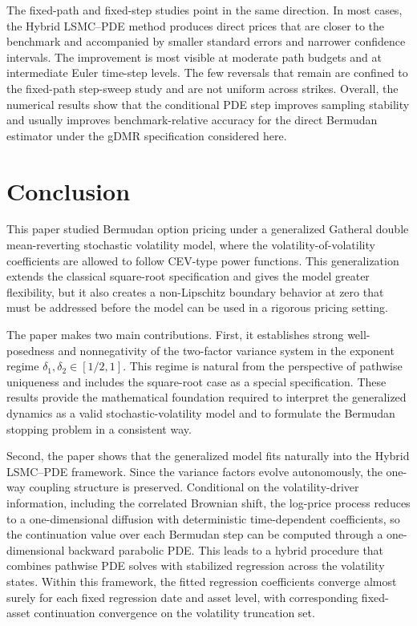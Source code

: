 \documentclass[pdflatex,sn-mathphys-num]{sn-jnl}
\theoremstyle{thmstyleone}%
\theoremstyle{thmstylethree}%
\theoremstyle{thmstyletwo}%
\begin{document}


The fixed-path and fixed-step studies point in the same direction. In most cases, the Hybrid LSMC--PDE method produces direct prices that are closer to the benchmark and accompanied by smaller standard errors and narrower confidence intervals. The improvement is most visible at moderate path budgets and at intermediate Euler time-step levels. The few reversals that remain are confined to the fixed-path step-sweep study and are not uniform across strikes. Overall, the numerical results show that the conditional PDE step improves sampling stability and usually improves benchmark-relative accuracy for the direct Bermudan estimator under the gDMR specification considered here.



\section{Conclusion}\label{sec:conclusion}
This paper studied Bermudan option pricing under a generalized Gatheral double mean-reverting stochastic volatility model, where the volatility-of-volatility coefficients are allowed to follow CEV-type power functions. This generalization extends the classical square-root specification and gives the model greater flexibility, but it also creates a non-Lipschitz boundary behavior at zero that must be addressed before the model can be used in a rigorous pricing setting.

The paper makes two main contributions. First, it establishes strong well-posedness and nonnegativity of the two-factor variance system in the exponent regime $\delta_1, \delta_2 \in [1/2,1]$. This regime is natural from the perspective of pathwise uniqueness and includes the square-root case as a special specification. These results provide the mathematical foundation required to interpret the generalized dynamics as a valid stochastic-volatility model and to formulate the Bermudan stopping problem in a consistent way.

Second, the paper shows that the generalized model fits naturally into the Hybrid LSMC--PDE framework. Since the variance factors evolve autonomously, the one-way coupling structure is preserved. Conditional on the volatility-driver information, including the correlated Brownian shift, the log-price process reduces to a one-dimensional diffusion with deterministic time-dependent coefficients, so the continuation value over each Bermudan step can be computed through a one-dimensional backward parabolic PDE. This leads to a hybrid procedure that combines pathwise PDE solves with stabilized regression across the volatility states. Within this framework, the fitted regression coefficients converge almost surely for each fixed regression date and asset level, with corresponding fixed-asset continuation convergence on the volatility truncation set.
\end{document}
